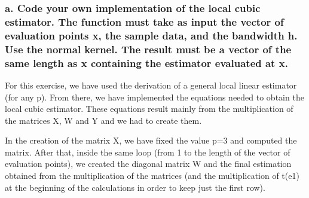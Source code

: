 \documentclass[
]{article}
\begin{document}
\hypertarget{a.-code-your-own-implementation-of-the-local-cubic-estimator.-the-function-must-take-as-input-the-vector-of-evaluation-points-x-the-sample-data-and-the-bandwidth-h.-use-the-normal-kernel.-the-result-must-be-a-vector-of-the-same-length-as-x-containing-the-estimator-evaluated-at-x.}{%
\subsubsection{a. Code your own implementation of the local cubic
estimator. The function must take as input the vector of evaluation
points x, the sample data, and the bandwidth h. Use the normal kernel.
The result must be a vector of the same length as x containing the
estimator evaluated at
x.}\label{a.-code-your-own-implementation-of-the-local-cubic-estimator.-the-function-must-take-as-input-the-vector-of-evaluation-points-x-the-sample-data-and-the-bandwidth-h.-use-the-normal-kernel.-the-result-must-be-a-vector-of-the-same-length-as-x-containing-the-estimator-evaluated-at-x.}}

For this exercise, we have used the derivation of a general local linear
estimator (for any p). From there, we have implemented the equations
needed to obtain the local cubic estimator. These equations result
mainly from the multiplication of the matrices X, W and Y and we had to
create them.

In the creation of the matrix X, we have fixed the value p=3 and
computed the matrix. After that, inside the same loop (from 1 to the
length of the vector of evaluation points), we created the diagonal
matrix W and the final estimation obtained from the multiplication of
the matrices (and the multiplication of t(e1) at the beginning of the
calculations in order to keep just the first row).
\end{document}
